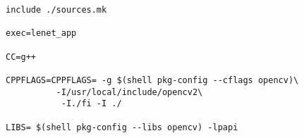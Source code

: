 
\lstset{framesep=-10pt, xleftmargin=-10pt}
\begin{lstlisting}[caption={Changes to Makefile},label={listing:6}]
include ./sources.mk

exec=lenet_app

CC=g++

CPPFLAGS=CPPFLAGS= -g $(shell pkg-config --cflags opencv)\
          -I/usr/local/include/opencv2\
           -I./fi -I ./
           
LIBS= $(shell pkg-config --libs opencv) -lpapi 
\end{lstlisting}


